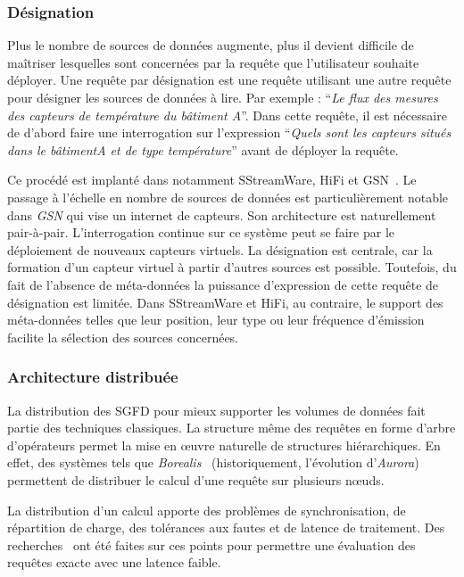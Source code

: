 \subsubsection{Désignation}\label{sec:rw:sgfd:infra:designation}
Plus le nombre de sources de données augmente, plus il devient difficile de maîtriser lesquelles sont concernées par la requête que l'utilisateur souhaite déployer. Une requête par désignation est une requête utilisant une autre requête pour désigner les sources de données à lire. Par exemple : \enquote{\it Le flux des mesures des capteurs de température du bâtiment A}. Dans cette requête, il est nécessaire de d'abord faire une interrogation sur l'expression \enquote{\it Quels sont les capteurs situés dans le bâtiment\textit{A} et de type \textit{température}} avant de déployer la requête.

Ce procédé est implanté dans notamment SStreamWare, HiFi et GSN~\cite{Aberer:gsn}. Le passage à l'échelle en nombre de sources de données est particulièrement notable dans \textit{GSN} qui vise un internet de capteurs. Son architecture est naturellement pair-à-pair. L’interrogation continue sur ce système peut se faire par le déploiement de nouveaux capteurs virtuels. La désignation est centrale, car la formation d’un capteur virtuel à partir d’autres sources est possible. Toutefois, du fait de l’absence de méta-données la puissance d'expression de cette requête de désignation est limitée. Dans SStreamWare et HiFi, au contraire, le support des méta-données telles que leur position, leur type ou leur fréquence d'émission facilite la sélection des sources concernées.

\subsubsection{Architecture distribuée}
La distribution des SGFD pour mieux supporter les volumes de données fait partie des techniques classiques. La structure même des requêtes en forme d'arbre d'opérateurs permet la mise en œuvre naturelle de structures hiérarchiques. En effet, des systèmes tels que \textit{Borealis}~\cite{Abadi:borealis} (historiquement, l'évolution d'\textit{Aurora}) permettent de distribuer le calcul d'une requête sur plusieurs nœuds.

La distribution d'un calcul apporte des problèmes de synchronisation, de répartition de charge, des tolérances aux fautes et de latence de traitement. Des recherches~\cite{Hwang:distributed, Tucker:heartbeat} ont été faites sur ces points pour permettre une évaluation des requêtes exacte avec une latence faible.

